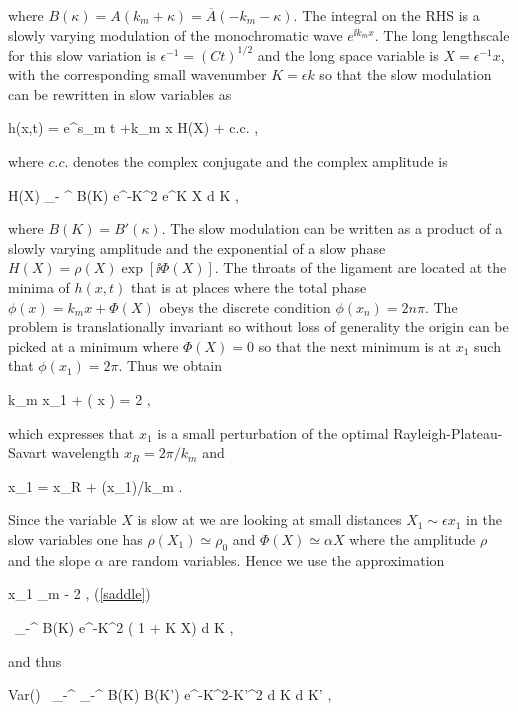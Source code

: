 where $B(\kappa) = A(k_m + \kappa) = \overline A(-k_m -\kappa)$.
The integral on the RHS is a slowly varying modulation of the monochromatic wave $e^{\ii k_m x}$. 
The long lengthscale for this slow variation is $\epsilon^{-1} = (C t)^{1/2}$ and 
the long space variable is $X = \epsilon^{-1} x$, with the corresponding small 
wavenumber $K = \epsilon k$ so that the slow modulation can be rewritten in slow variables as

\be
h(x,t) =   e^{s_m t +\ii k_m x} H(X)  + c.c. \label{slowamp} , 
\nd

where $c.c.$ denotes the complex conjugate and the complex amplitude is

\be
H(X) \simeq \int_{- \infty}^{\infty}  B(K) e^{-K^2}  e^{\ii K X} {\textrm{d}} K \label{saddle} , 
\nd

where $B(K) = B'(\kappa)$. 
The slow modulation can be written as a product of a slowly varying amplitude 
and the exponential of a slow phase $H(X) = \rho(X) \exp [{ \ii \Phi(X) }]$. 
The throats of the  ligament are located at the minima of
$h(x,t)$ that is at places where the total phase
$\phi(x) =  k_m x + \Phi ( X) $ obeys the discrete condition $ \phi(x_n) = 2 n \pi $.
The problem is translationally invariant so without loss of generality the origin can be picked
at a minimum where $\Phi(X) = 0$ so that the next minimum is at $x_1$ such that  $\phi(x_1)= 2 \pi$.
Thus we obtain 

\be
k_m x_1 + \Phi ( \epsilon x ) = 2 \pi , 
\nd

which expresses that $x_1$ is a small perturbation of the optimal Rayleigh-Plateau-Savart wavelength
$x_{R} = 2 \pi / k_m$ and

\be
x_1 = x_R + \Phi(\epsilon x_1)/k_m . 
\nd

Since the variable $X$ is slow at we are looking at small 
distances $X_1 \sim \epsilon x_1$ in the slow variables
one has $\rho(X_1) \simeq \rho_0$ and  $\Phi(X) \simeq \alpha X$ where 
the amplitude $\rho$ and the slope $\alpha$ are random
variables. Hence we use the approximation  

\be
x_1 \simeq \lambda_m -  2 \pi \alpha \epsilon  \label{x1a} , 
\nd
(\ref{saddle})

\be
\rho [ 1 + \ii \alpha X] \simeq \int_{-\infty}^{\infty}  B(K) e^{-K^2} ( 1 + \ii K X)  {\textrm{d}} K ,
\nd

and thus

\be
Var(\rho)  \simeq \int_{-\infty}^{\infty} \int_{-\infty}^{\infty}  B(K) B(K') e^{-K^2-K'^2}  {\textrm{d}} K  {\textrm{d}} K'  , 
\nd

